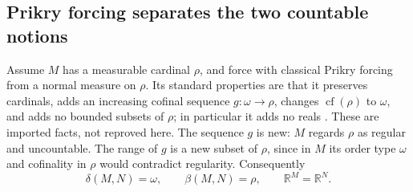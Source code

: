 \documentclass[11pt,letterpaper]{article}
\numberwithin{equation}{section}
\theoremstyle{definition}
\theoremstyle{remark}
\newcommand{\R}{\mathbb R}
\newcommand{\cf}{\operatorname{cf}}
\begin{document}
\subsection{Prikry forcing separates the two countable notions}\label{univ:sub:prikry}

Assume $M$ has a measurable cardinal $\rho$, and force with classical Prikry
forcing from a normal measure on $\rho$. Its standard properties are that it
preserves cardinals, adds an increasing cofinal sequence $g:\omega\to\rho$,
changes $\cf(\rho)$ to $\omega$, and adds no bounded subsets of $\rho$; in
particular it adds no reals \cite{Prikry,Gitik,Benhamou}. These are imported
facts, not reproved here. The sequence $g$ is new: $M$ regards $\rho$ as
regular and uncountable. The range of $g$ is a new subset of $\rho$, since in
$M$ its order type $\omega$ and cofinality in $\rho$ would contradict regularity.
Consequently
\begin{equation}\label{univ:eq:prikry}
 \delta(M,N)=\omega,\qquad \beta(M,N)=\rho,\qquad \R^M=\R^N.
\end{equation}
\end{document}
